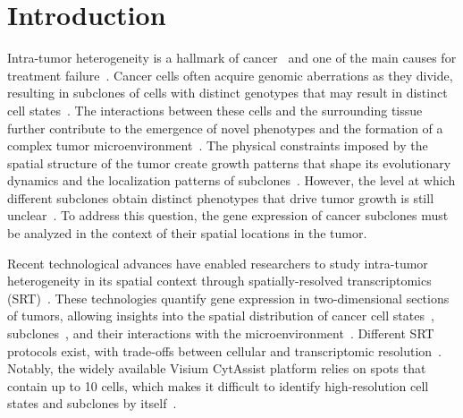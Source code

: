 \documentclass{article}
\begin{document}
\section*{Introduction}
\label{sec:introduction}
Intra-tumor heterogeneity is a hallmark of cancer~\cite{marusyk2012intra} and one of the main causes for treatment failure~\cite{marusyk2020intratumor}. Cancer cells often acquire genomic aberrations as they divide, resulting in subclones of cells with distinct genotypes that may result in distinct cell states~\cite{nam2021integrating, whiting2024phenotypic}. The interactions between these cells and the surrounding tissue further contribute to the emergence of novel phenotypes and the formation of a complex tumor microenvironment~\cite{de2023evolving}. The physical constraints imposed by the spatial structure of the tumor create growth patterns that shape its evolutionary dynamics and the localization patterns of subclones~\cite{lomakin2022spatial, noble2022spatial}. However, the level at which different subclones obtain distinct phenotypes that drive tumor growth is still unclear~\cite{salehi2021clonal, koblan2025high}. To address this question, the gene expression of cancer subclones must be analyzed in the context of their spatial locations in the tumor.

Recent technological advances have enabled researchers to study intra-tumor heterogeneity in its spatial context through spatially-resolved transcriptomics (SRT)~\cite{staahl2016visualization, chen2024spatial}. These technologies quantify gene expression in two-dimensional sections of tumors, allowing insights into the spatial distribution of cancer cell states~\cite{barkley2022cancer}, subclones~\cite{erickson2022spatially}, and their interactions with the microenvironment~\cite{liu2025conserved}. Different SRT protocols exist, with trade-offs between cellular and transcriptomic resolution~\cite{tian2023expanding}. Notably, the widely available Visium CytAssist platform relies on spots that contain up to 10 cells, which makes it difficult to identify high-resolution cell states and subclones by itself~\cite{janesick2023high}.
\end{document}

